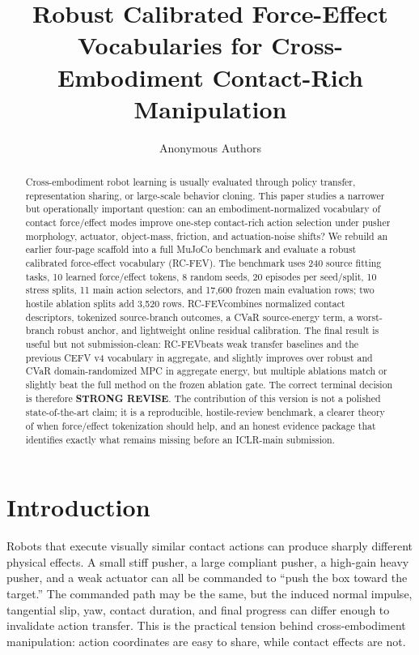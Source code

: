 \documentclass{article}
\title{Robust Calibrated Force-Effect Vocabularies for Cross-Embodiment Contact-Rich Manipulation}
\author{Anonymous Authors}
\newcommand{\method}{RC-FEV}
\begin{document}
\maketitle

\begin{abstract}
Cross-embodiment robot learning is usually evaluated through policy transfer, representation sharing, or large-scale behavior cloning. This paper studies a narrower but operationally important question: can an embodiment-normalized vocabulary of contact force/effect modes improve one-step contact-rich action selection under pusher morphology, actuator, object-mass, friction, and actuation-noise shifts? We rebuild an earlier four-page scaffold into a full MuJoCo benchmark and evaluate a robust calibrated force-effect vocabulary (\method). The benchmark uses 240 source fitting tasks, 10 learned force/effect tokens, 8 random seeds, 20 episodes per seed/split, 10 stress splits, 11 main action selectors, and 17,600 frozen main evaluation rows; two hostile ablation splits add 3,520 rows. \method combines normalized contact descriptors, tokenized source-branch outcomes, a CVaR source-energy term, a worst-branch robust anchor, and lightweight online residual calibration. The final result is useful but not submission-clean: \method beats weak transfer baselines and the previous CEFV v4 vocabulary in aggregate, and slightly improves over robust and CVaR domain-randomized MPC in aggregate energy, but multiple ablations match or slightly beat the full method on the frozen ablation gate. The correct terminal decision is therefore \textbf{STRONG REVISE}. The contribution of this version is not a polished state-of-the-art claim; it is a reproducible, hostile-review benchmark, a clearer theory of when force/effect tokenization should help, and an honest evidence package that identifies exactly what remains missing before an ICLR-main submission.
\end{abstract}

\section{Introduction}

Robots that execute visually similar contact actions can produce sharply different physical effects. A small stiff pusher, a large compliant pusher, a high-gain heavy pusher, and a weak actuator can all be commanded to ``push the box toward the target.'' The commanded path may be the same, but the induced normal impulse, tangential slip, yaw, contact duration, and final progress can differ enough to invalidate action transfer. This is the practical tension behind cross-embodiment manipulation: action coordinates are easy to share, while contact effects are not.
\end{document}
